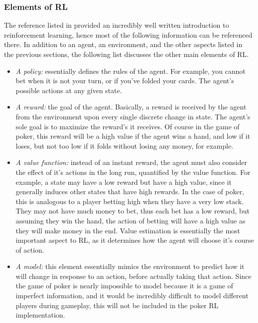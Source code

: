 \documentclass[12pt]{article}
\begin{document}
\subsubsection{Elements of RL}
The reference listed in \cite{rlref} provided an incredibly well written introduction to reinforcement learning, hence most of the following information can be referenced there.
In addition to an agent, an environment, and the other aspects listed in the previous sections, the following list discusses the other main elements of RL.
\begin{itemize}
	\item \textit{A policy:} essentially defines the rules of the agent. For example, you cannot bet when it is not your turn, or if you've folded your cards. The agent's possible actions at any given state.
	\item \textit{A reward:} the goal of the agent. Basically, a reward is received by the agent from the environment upon every single discrete change in state. The agent's sole goal is to maximize the reward's it receives. Of course in the game of poker, this reward will be a high value if the agent wins a hand, and low if it loses, but not too low if it folds without losing any money, for example.
	\item \textit{A value function:} instead of an instant reward, the agent must also consider the effect of it's actions in the long run, quantified by the value function. For example, a state may have a low reward but have a high value, since it generally induces other states that have high rewards. In the case of poker, this is analogous to a player betting high when they have a very low stack. They may not have much money to bet, thus each bet has a low reward, but assuming they win the hand, the action of betting will have a high value as they will make money in the end. Value estimation is essentially the most important aspect to RL, as it determines how the agent will choose it's course of action.
	\item \textit{A model:} this element essentially mimics the environment to predict how it will change in response to an action, before actually taking that action. Since the game of poker is nearly impossible to model because it is a game of imperfect information, and it would be incredibly difficult to model different players during gameplay, this will not be included in the poker RL implementation.
\end{itemize}
\end{document}

